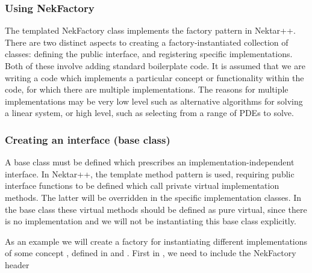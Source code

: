 




\subsubsection{Using NekFactory}
The templated NekFactory class implements the factory pattern in Nektar++.
There are two distinct aspects to creating a factory-instantiated collection of
classes: defining the public interface, and registering specific
implementations. Both of these involve adding standard boilerplate code. It is
assumed that we are writing a code which implements a particular concept or
functionality within the code, for which there are multiple implementations. The
reasons for multiple implementations may be very low level such as alternative
algorithms for solving a linear system, or high level, such as selecting from a
range of PDEs to solve.

\subsubsection{Creating an interface (base class)}
A base class must be defined which prescribes an implementation-independent
interface. In Nektar++, the template method pattern is used, requiring public
interface functions to be defined which call private virtual implementation
methods. The latter will be overridden in the specific implementation classes.
In the base class these virtual methods should be defined as pure virtual, since
there is no implementation and we will not be instantiating this base class
explicitly.

As an example we will create a factory for instantiating different
implementations of some concept , defined in
 and . First in ,
we need to include the NekFactory header

